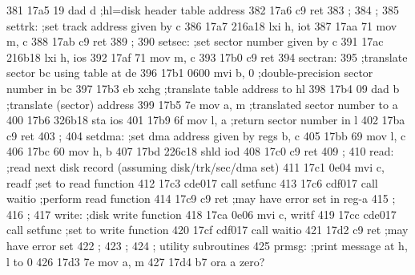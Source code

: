 381      17a5 19                   dad      d          ;hl=disk header table address
382      17a6 c9                   ret
383                       ;
384                       ;
385                       settrk:  ;set track address given by c
386      17a7 216a18               lxi      h, iot
387      17aa 71                   mov      m, c
388      17ab c9                   ret
389                       ;
390                       setsec:  ;set sector number given by c
391      17ac 216b18               lxi      h, ios
392      17af 71                   mov      m, c
393      17b0 c9                   ret
394                       sectran:
395                                         ;translate sector bc using table at de
396      17b1 0600                 mvi      b, 0       ;double-precision sector number in bc
397      17b3 eb                   xchg                ;translate table address to hl
398      17b4 09                   dad      b          ;translate (sector) address
399      17b5 7e                   mov      a, m       ;translated sector number to a
400      17b6 326b18               sta      ios 
401      17b9 6f                   mov      l, a       ;return sector number in l
402      17ba c9                   ret
403                       ;
404                       setdma:  ;set dma address given by regs b, c
405      17bb 69                   mov      l, c
406      17bc 60                   mov      h, b
407      17bd 226c18               shld     iod
408      17c0 c9                   ret
409                       ;
410                       read:    ;read next disk record (assuming disk/trk/sec/dma set)
411      17c1 0e04                 mvi      c, readf   ;set to read function
412      17c3 cde017               call     setfunc
413      17c6 cdf017               call     waitio     ;perform read function
414      17c9 c9                   ret                 ;may have error set in reg-a
415                       ;  
416                       ;
417                       write:   ;disk write function
418      17ca 0e06                 mvi      c, writf
419      17cc cde017               call     setfunc    ;set to write function
420      17cf cdf017               call     waitio
421      17d2 c9                   ret                 ;may have error set
422                       ;
423                       ;
424                       ;        utility subroutines
425                       prmsg:   ;print message at h, l to 0
426      17d3 7e                   mov      a, m
427      17d4 b7                   ora      a          zero?
